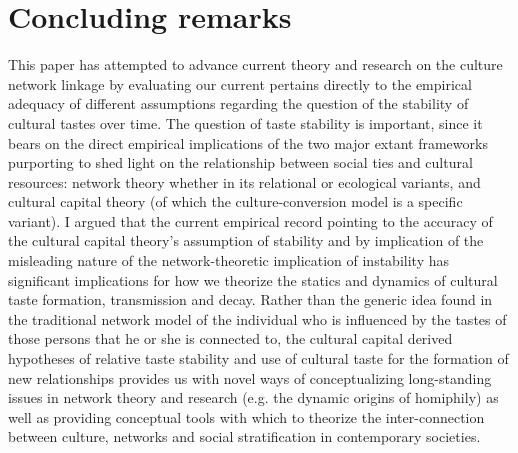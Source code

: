 \documentclass[11pt]{article}
\begin{document}
\section{Concluding remarks}
This paper has attempted to advance current theory and research on the culture network linkage by evaluating our current  pertains directly to the empirical adequacy of different assumptions regarding the question of the stability of cultural tastes over time.  The question of taste stability is important, since it bears on the direct empirical implications of the two major extant frameworks purporting to shed light on the relationship between social ties and cultural resources:  network theory whether in its relational \citep{erickson96} or ecological \citep{mark98a, mark98b, mcpherson04} variants, and cultural capital theory \citep{bourdieu84, bourdieu86} (of which the culture-conversion model is a specific variant).  I argued that the current empirical record pointing to the accuracy of the cultural capital theory's assumption of stability and by implication of the misleading nature of the network-theoretic implication of instability has significant implications for how we theorize the statics and dynamics of cultural taste formation, transmission and decay.  Rather than the generic idea found in the traditional network model of the individual who is influenced by the tastes of those persons that he or she is connected to, the cultural capital derived hypotheses of relative taste stability and use of cultural taste for the formation of new relationships provides us with novel ways of conceptualizing long-standing issues in network theory and research (e.g. the dynamic origins of homiphily) as well as providing conceptual tools with which to theorize the inter-connection between culture, networks and social stratification in contemporary societies.
\newpage
\singlespacing
\footnotesize


\end{document}
